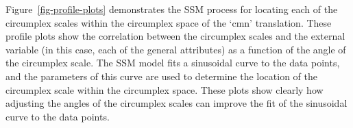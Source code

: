 \documentclass[
  authoryear,
  preprint,
  3p]{elsarticle}
\begin{document}
Figure~\ref{fig-profile-plots} demonstrates the SSM process for locating
each of the circumplex scales within the circumplex space of the `cmn'
translation. These profile plots show the correlation between the
circumplex scales and the external variable (in this case, each of the
general attributes) as a function of the angle of the circumplex scale.
The SSM model fits a sinusoidal curve to the data points, and the
parameters of this curve are used to determine the location of the
circumplex scale within the circumplex space. These plots show clearly
how adjusting the angles of the circumplex scales can improve the fit of
the sinusoidal curve to the data points.

\begin{figure}

\begin{minipage}[t]{0.25\linewidth}



\end{minipage}%
%
\begin{minipage}[t]{0.25\linewidth}

\end{minipage}
\end{figure}
\end{document}
